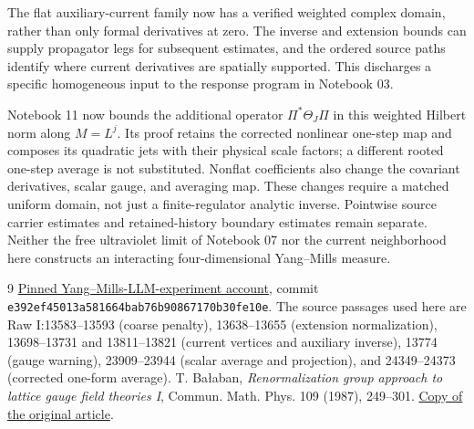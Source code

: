\documentclass[11pt]{article}
\theoremstyle{remark}
\begin{document}
The flat auxiliary-current family now has a verified weighted
complex domain, rather than only formal derivatives at zero.
The inverse and extension bounds can supply propagator legs for
subsequent estimates, and the ordered source paths identify where
current derivatives are spatially supported. This discharges a
specific homogeneous input to the response program in Notebook 03.

Notebook 11 now bounds the additional operator $\Pi^*\Theta_J\Pi$
in this weighted Hilbert norm along $M=L^j$. Its proof retains the
corrected nonlinear one-step map and composes its quadratic jets
with their physical scale factors; a different rooted one-step
average is not substituted. Nonflat coefficients also change the covariant derivatives,
scalar gauge, and averaging map. These changes require a matched
uniform domain, not just a finite-regulator analytic inverse.
Pointwise source carrier estimates and retained-history boundary
estimates remain separate. Neither the free ultraviolet limit of
Notebook 07 nor the current neighborhood here constructs an
interacting four-dimensional Yang--Mills measure.

\begin{thebibliography}{9}
\href{https://github.com/ethanwsussman/Yang--Mills-LLM-experiment/tree/e392ef45013a581664bab76b90867170b30fe10e}
{Pinned Yang--Mills-LLM-experiment account}, commit
\texttt{e392ef4501\allowbreak 3a581664ba\allowbreak b76b908671\allowbreak 70b30fe10e}.
The source passages used here are Raw I:13583--13593
(coarse penalty), 13638--13655 (extension normalization),
13698--13731 and 13811--13821 (current vertices and auxiliary inverse),
13774 (gauge warning), 23909--23944 (scalar average and projection),
and 24349--24373 (corrected one-form average).
 T. Ba\l aban,
\emph{Renormalization group approach to lattice gauge field theories I},
Commun. Math. Phys. 109 (1987), 249--301.
\href{https://scispace.com/pdf/renormalization-group-approach-to-lattice-gauge-field-3ygai0vxt1.pdf}
{Copy of the original article}.
\end{thebibliography}
\end{document}
